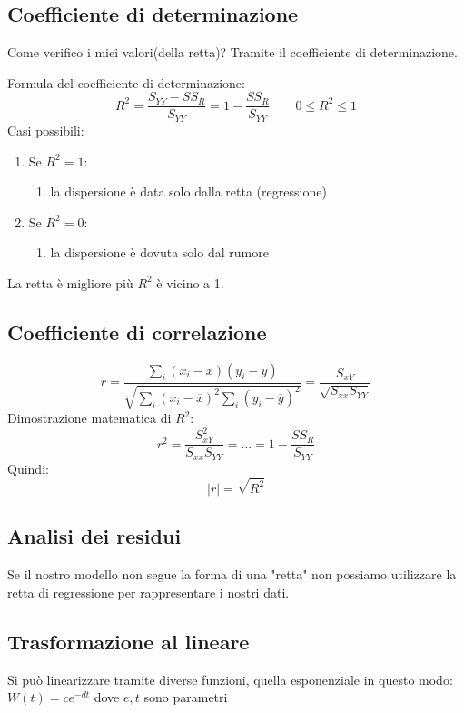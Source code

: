\documentclass[]{article}
\begin{document}
    \subsection{Coefficiente di determinazione}\label{sec:coefficiente-di-determinazione}
    Come verifico i miei valori(della retta)? Tramite il coefficiente di determinazione.
    
    Formula del coefficiente di determinazione:
    \[
     R^2 = \frac{S_{YY}-SS_R}{S_{YY}} = 1- \frac{SS_R}{S_{YY}} \quad  \quad 0 \leq R^2 \leq 1 
    \]
    Casi possibili:
    \begin{enumerate}
    \item 
    Se $R^2 = 1$:
    \begin{enumerate}
    \item 
    la dispersione è data solo dalla retta (regressione)
    \end{enumerate}
    \item 
    Se $R^2 = 0$:
    \begin{enumerate}
    \item 
    la dispersione è dovuta solo dal rumore
    \end{enumerate}
    \end{enumerate}
    
    La retta è migliore più $R^2$ è vicino a 1.
    \subsection{Coefficiente di correlazione}\label{sec:coefficiente-di-correlazione}\[
     r = \frac{\sum_i (x_i - \overline x)(y_i - \overline y)}{\sqrt{\sum_i (x_i - \overline x)^2 \sum_i(y_i - \overline y)^2}} = \frac{S_{xY}}{\sqrt{S_{xx}S_{YY}}} 
    \]
    Dimostrazione matematica di $R^2$:
    \[
     r^2 = \frac{S_{xY}^2}{S_{xx}S_{YY}} = \ldots = 1- \frac{SS_R}{S_{YY}}
    \]
    Quindi:
    \[
     |r| = \sqrt{R^2} 
    \]\subsection{Analisi dei residui}\label{sec:analisi-dei-residui}
    Se il nostro modello non segue la forma di una "retta" non possiamo utilizzare la retta di regressione per rappresentare i nostri dati.
    \subsection{Trasformazione al lineare}\label{sec:trasformazione-al-lineare}
    Si può linearizzare tramite diverse funzioni, quella esponenziale in questo modo:
    $W(t) = ce^{-dt}$ dove $e, t$ sono parametri
    
\end{document}
